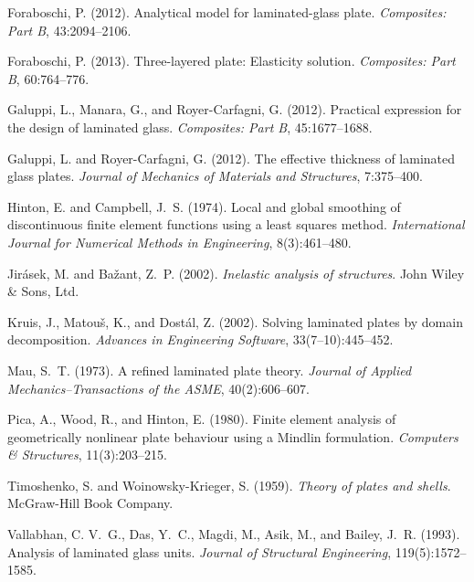 \documentclass[11pt]{article}
\begin{document}
\begin{thebibliography}{10}
Foraboschi, P. (2012).
Analytical model for laminated-glass plate.
{\em Composites: Part B}, 43:2094--2106.

Foraboschi, P. (2013).
Three-layered plate: Elasticity solution.
{\em Composites: Part B}, 60:764--776.

Galuppi, L., Manara, G., and Royer-Carfagni, G. (2012).
Practical expression for the design of laminated glass.
{\em Composites: Part B}, 45:1677--1688.

Galuppi, L. and Royer-Carfagni, G. (2012).
The effective thickness of laminated glass plates.
{\em Journal of Mechanics of Materials and Structures}, 7:375--400.

Hinton, E. and Campbell, J.~S. (1974).
Local and global smoothing of discontinuous finite element functions
  using a least squares method.
{\em International Journal for Numerical Methods in Engineering},
  8(3):461--480.

Jir\'{a}sek, M. and Ba\v{z}ant, Z.~P. (2002).
{\em Inelastic analysis of structures}.
John Wiley \& Sons, Ltd.

Kruis, J., Matou\v{s}, K., and Dost\'{a}l, Z. (2002).
Solving laminated plates by domain decomposition.
{\em Advances in Engineering Software}, 33(7--10):445--452.

Mau, S.~T. (1973).
A refined laminated plate theory.
{\em Journal of Applied Mechanics--Transactions of the ASME},
  40(2):606--607.

Pica, A., Wood, R., and Hinton, E. (1980).
Finite element analysis of geometrically nonlinear plate behaviour
  using a {M}indlin formulation.
{\em Computers \& Structures}, 11(3):203--215.

Timoshenko, S. and Woinowsky-Krieger, S. (1959).
{\em Theory of plates and shells}.
McGraw-Hill Book Company.

Vallabhan, C. V.~G., Das, Y.~C., Magdi, M., Asik, M., and Bailey, J.~R. (1993).
Analysis of laminated glass units.
{\em Journal of Structural Engineering}, 119(5):1572--1585.


\end{thebibliography}
\end{document}
